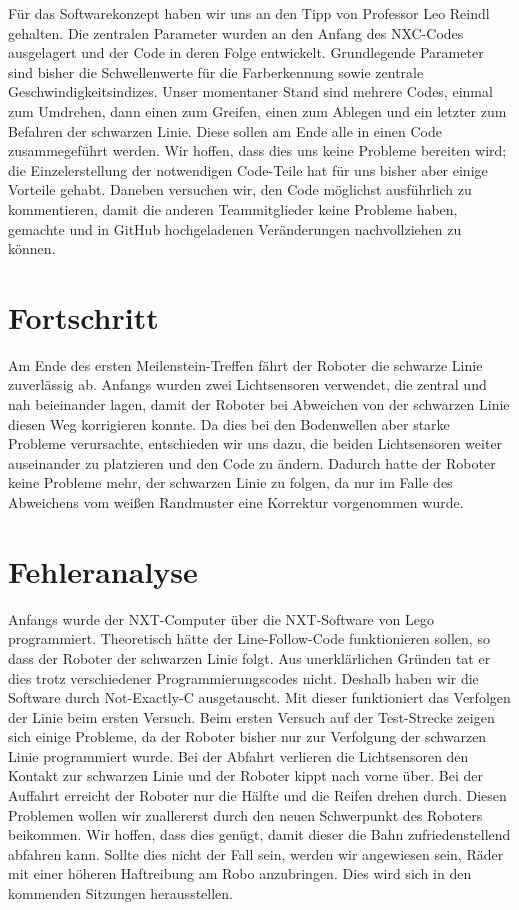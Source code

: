 \documentclass[11pt,a4paper]{article}
\begin{document}
Für das Softwarekonzept haben wir uns an den Tipp von Professor Leo Reindl gehalten. Die zentralen Parameter wurden an den Anfang des
NXC-Codes ausgelagert und der Code in deren Folge entwickelt. Grundlegende Parameter sind bisher die Schwellenwerte für die Farberkennung
sowie zentrale Geschwindigkeitsindizes. Unser momentaner Stand sind mehrere Codes, einmal zum Umdrehen, dann einen zum Greifen, einen zum Ablegen
und ein letzter zum Befahren der schwarzen Linie. Diese sollen am Ende alle in einen Code zusammegeführt werden. Wir hoffen, dass dies uns keine 
Probleme bereiten wird; die Einzelerstellung der notwendigen Code-Teile hat für uns bisher aber einige Vorteile gehabt. 
Daneben versuchen wir, den Code möglichst ausführlich zu kommentieren, damit die anderen Teammitglieder keine Probleme haben, gemachte und 
in GitHub hochgeladenen Veränderungen nachvollziehen zu können. 

\section{Fortschritt}

Am Ende des ersten Meilenstein-Treffen fährt der Roboter die schwarze Linie zuverlässig ab. Anfangs wurden zwei Lichtsensoren verwendet, 
die zentral und nah beieinander lagen, damit der Roboter bei Abweichen von der schwarzen Linie diesen Weg korrigieren konnte. 
Da dies bei den Bodenwellen aber starke Probleme verursachte, entschieden wir uns dazu, die beiden Lichtsensoren weiter auseinander zu 
platzieren und den Code zu ändern. Dadurch hatte der Roboter keine Probleme mehr, der schwarzen Linie zu folgen, da nur im Falle des Abweichens
vom weißen Randmuster eine Korrektur vorgenommen wurde.  

\section{Fehleranalyse}

Anfangs wurde der NXT-Computer über die NXT-Software von Lego programmiert. Theoretisch hätte der Line-Follow-Code funktionieren sollen, 
so dass der Roboter der schwarzen Linie folgt. Aus unerklärlichen Gründen tat er dies trotz verschiedener Programmierungscodes nicht. 
Deshalb haben wir die Software durch Not-Exactly-C ausgetauscht. Mit dieser funktioniert das Verfolgen der Linie beim ersten Versuch. 
Beim ersten Versuch auf der Test-Strecke zeigen sich einige Probleme, da der Roboter bisher nur zur Verfolgung der schwarzen Linie 
programmiert wurde. Bei der Abfahrt verlieren die Lichtsensoren den Kontakt zur schwarzen Linie und der Roboter kippt nach vorne über. 
Bei der Auffahrt erreicht der Roboter nur die Hälfte und die Reifen drehen durch. 
Diesen Problemen wollen wir zuallererst durch den neuen Schwerpunkt des Roboters beikommen. Wir hoffen, dass dies genügt, damit dieser
die Bahn zufriedenstellend abfahren kann. Sollte dies nicht der Fall sein, werden wir angewiesen sein, Räder mit einer höheren Haftreibung
am Robo anzubringen. Dies wird sich in den kommenden Sitzungen herausstellen.  
\end{document}
